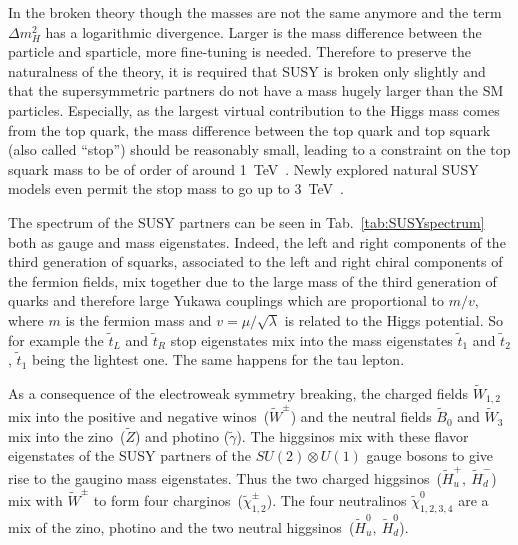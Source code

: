 In the broken theory though the masses are not the same anymore and the term $\Delta m_{H}^{2}$ has a logarithmic divergence. Larger is the mass difference between the particle and sparticle, more fine-tuning is needed. Therefore to preserve the naturalness of the theory, it is required that SUSY is broken only slightly and that the supersymmetric partners do not have a mass hugely larger than the SM particles. Especially, as the largest virtual  contribution to the Higgs mass comes from the top quark, the mass difference between the top quark and top squark (also called ``stop'') should be reasonably small, leading to a constraint on the top squark mass to be of order of around 1~TeV~\cite{Martin:1997ns, Barbieri:1987fn, Papucci:2011wy}. Newly explored natural SUSY models even permit the stop mass to go up to 3~TeV~\cite{Baer:2016bwh}.


The spectrum of the SUSY partners can be seen in Tab.~\ref{tab:SUSYspectrum} both as gauge and mass eigenstates. Indeed, the left and right components of the third generation of squarks, associated to the left and right chiral components of the fermion fields, mix together due to the large mass of the third generation of quarks and therefore large Yukawa couplings which are proportional to $m/v$, where $m$ is the fermion mass and $v = \mu/\sqrt{\lambda}$ is related to the Higgs potential. So  for example the $\tilde{t}_{L}$ and  $\tilde{t}_{R}$ stop eigenstates mix into the mass eigenstates  $\tilde{t}_{1}$ and  $\tilde{t}_{2}$,  $\tilde{t}_{1}$ being the lightest one. The same happens for the tau lepton.


As a consequence of the electroweak symmetry breaking, the charged fields $\tilde{W}_{1,2}$ mix into the positive and negative winos~($\tilde{W}^{\pm}$) and the neutral fields $\tilde{B}_{0}$ and $\tilde{W}_{3}$ mix into the zino~($\tilde{Z}$) and photino ($\tilde{\gamma}$). The higgsinos mix with these flavor eigenstates of the SUSY partners of the $SU(2) \otimes U(1)$ gauge bosons to give rise to the gaugino mass eigenstates. Thus the two charged higgsinos~($\tilde{H}_{u}^{+},~\tilde{H}_{d}^{-}$) mix with $\tilde{W}^{\pm}$ to form four charginos~($\tilde{\chi}_{1,2}^{\pm}$). The four neutralinos $\tilde{\chi}_{1,2,3,4}^{0}$ are a mix of the zino, photino and the two neutral higgsinos~($\tilde{H}_{u}^{0},~\tilde{H}_{d}^{0}$). 


